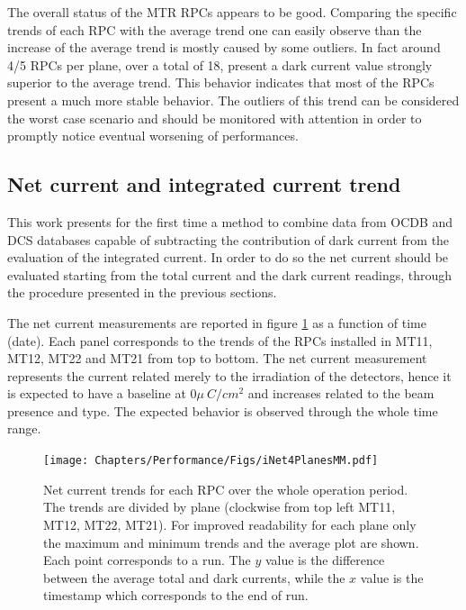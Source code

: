 The overall status of the MTR RPCs appears to be good.
Comparing the specific trends of each RPC with the average trend one can easily observe than the increase of the average trend is mostly caused by some outliers.
In fact around 4/5 RPCs per plane, over a total of 18, present a dark current value strongly superior to the average trend.
This behavior indicates that most of the RPCs present a much more stable behavior.
The outliers of this trend can be considered the worst case scenario and should be monitored with attention in order to promptly notice eventual worsening of performances.

\subsection{Net current and integrated current trend}
This work presents for the first time a method to combine data from OCDB and DCS databases capable of subtracting the contribution of dark current from the evaluation of the integrated current.
In order to do so the net current should be evaluated starting from the total current and the dark current readings, through the procedure presented in the previous sections.

The net current measurements are reported in figure \ref{fig:iNet4Planes} as a function of time (date).
Each panel corresponds to the trends of the RPCs installed in MT11, MT12, MT22 and MT21 from top to bottom.
The net current measurement represents the current related merely to the irradiation of the detectors, hence it is expected to have a baseline at $0 \mu~C/cm^2$ and increases related to the beam presence and type.
The expected behavior is observed through the whole time range.

\begin{figure}[!t]
\begin{center}
\texttt{[image: Chapters/Performance/Figs/iNet4PlanesMM.pdf]}
\caption{Net current trends for each RPC over the whole operation period. The trends are divided by plane (clockwise from top left MT11, MT12, MT22, MT21). For improved readability for each plane only the maximum and minimum trends and the average plot are shown. Each point corresponds to a run. The $y$ value is the difference between the average total and dark currents, while the $x$ value is the timestamp which corresponds to the end of run.}
\label{fig:iNet4Planes}
\end{center}
\end{figure}

